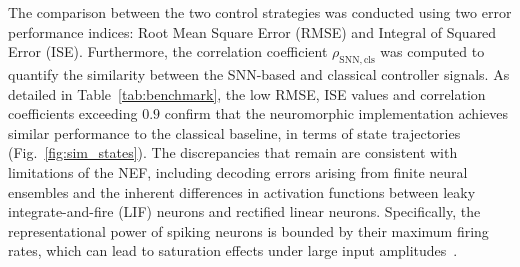 \documentclass[conference]{IEEEtran}
\begin{document}
The comparison between the two control strategies was conducted using two error performance indices: Root Mean Square Error (RMSE) and Integral of Squared Error (ISE). Furthermore, the correlation coefficient $\rho_{\mathrm{SNN,cls}}$ was computed to quantify the similarity between the SNN-based and classical controller signals. As detailed in Table~\ref{tab:benchmark}, the low RMSE, ISE values and correlation coefficients exceeding $0.9$ confirm that the neuromorphic implementation achieves similar performance to the classical baseline, in terms of state trajectories (Fig.~\ref{fig:sim_states}). The discrepancies that remain are consistent with limitations of the NEF, including decoding errors arising from finite neural ensembles and the inherent differences in activation functions between leaky integrate-and-fire (LIF) neurons and rectified linear neurons. Specifically, the representational power of spiking neurons is bounded by their maximum firing rates, which can lead to saturation effects under large input amplitudes~\cite{dewolf_neuromorphic_2023,rajendran_low-power_2019}.
\end{document}

